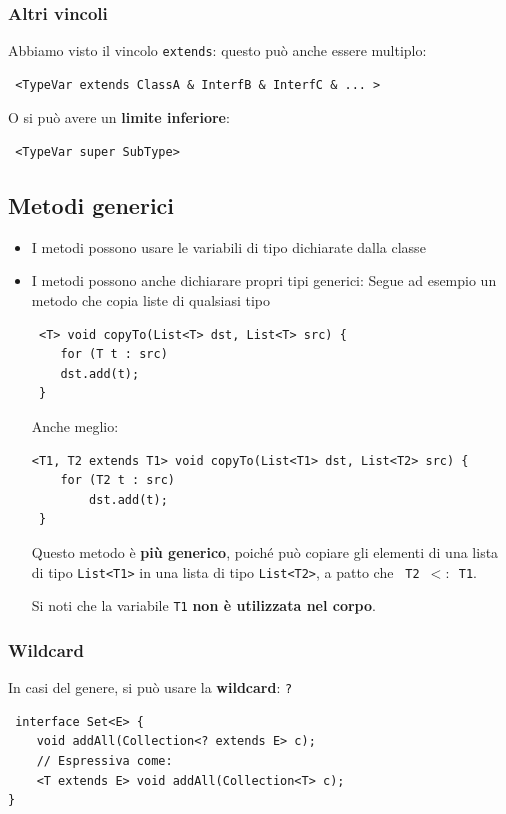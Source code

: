 \documentclass[a4paper,10pt]{article}
\begin{document}
\subsubsection{Altri vincoli}

Abbiamo visto il vincolo \texttt{extends}: questo può anche essere multiplo:
\begin{lstlisting}
 <TypeVar extends ClassA & InterfB & InterfC & ... >
\end{lstlisting}

O si può avere un \textbf{limite inferiore}:
\begin{lstlisting}
 <TypeVar super SubType>
\end{lstlisting}
\subsection{Metodi generici}

\begin{itemize}
 \item I metodi possono usare le variabili di tipo dichiarate dalla classe
 \item I metodi possono anche dichiarare propri tipi generici: Segue ad esempio un metodo che copia liste di qualsiasi tipo
 \begin{lstlisting}
 <T> void copyTo(List<T> dst, List<T> src) {
    for (T t : src)
    dst.add(t);
 }
\end{lstlisting}

Anche meglio:
\begin{lstlisting}
<T1, T2 extends T1> void copyTo(List<T1> dst, List<T2> src) {
    for (T2 t : src)
        dst.add(t);
 }
\end{lstlisting}
Questo metodo è \textbf{più generico}, poiché può copiare gli elementi di una lista di tipo \texttt{List<T1>} in una lista di tipo \texttt{List<T2>}, a patto che \texttt{ T2 $<:$ T1}. 

\smallskip

Si noti che la variabile \texttt{T1} \textbf{non è utilizzata nel corpo}. \smallskip

\end{itemize}
\subsubsection{Wildcard}
In casi del genere, si può usare la \textbf{wildcard}: \texttt{?}

\begin{lstlisting}
 interface Set<E> {
    void addAll(Collection<? extends E> c);
    // Espressiva come: 
    <T extends E> void addAll(Collection<T> c);
}
\end{lstlisting}
\end{document}
